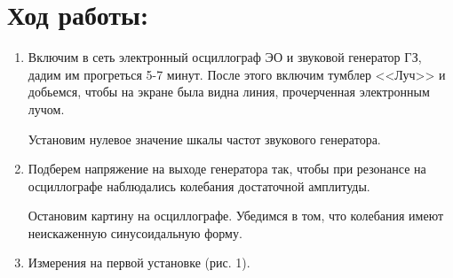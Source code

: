 \documentclass[a4paper,12pt]{article}
\begin{document}
\section{Ход работы:}
\begin{enumerate}
\renewcommand{\labelenumii}{\arabic{enumii})}
\itemsep0em
\item Включим в сеть электронный осциллограф ЭО и звуковой генератор ГЗ, дадим им прогреться 5-7 минут. После этого включим тумблер <<Луч>> и добьемся, чтобы на экране была видна линия, прочерченная электронным лучом.

	Установим нулевое значение шкалы частот звукового генератора.
\item Подберем напряжение на выходе генератора так, чтобы при резонансе на осциллографе наблюдались колебания достаточной амплитуды.

Остановим картину на осциллографе. Убедимся в том, что колебания имеют неискаженную синусоидальную форму.
\item Измерения на первой
установке (рис. 1).


\end{enumerate}
\end{document}
